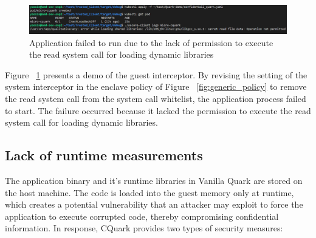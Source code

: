 \begin{figure}[H]
    \centering
    \includegraphics[width=1\textwidth]{images/application_failed_to_start_due_to_syscall_interceptor.png}
    \caption[Application failed to run due to the lack of permission to execute the read system call for loading dynamic libraries]{Application failed to run due to the lack of permission to execute the read system call for loading dynamic libraries}
    \label{fig:application_failed_to_start_due_to_syscall_interceptor}
\end{figure}


Figure ~\ref{fig:application_failed_to_start_due_to_syscall_interceptor} presents a demo of the guest interceptor. By revising the setting of the system interceptor in the enclave policy of Figure ~\ref{fig:generic_policy} to remove the read system call from the system call whitelist, 
the application process failed to start. The failure occurred because it lacked the permission to execute the read system call for loading dynamic libraries.
\subsection{Lack of runtime measurements}

The application binary and it’s runtime libraries in Vanilla Quark are stored on the host machine. The code is loaded into the guest memory only at runtime, which creates a potential vulnerability that an attacker may exploit to force the 
application to execute corrupted code, thereby compromising confidential information. In response, CQuark provides two types of security measures:

